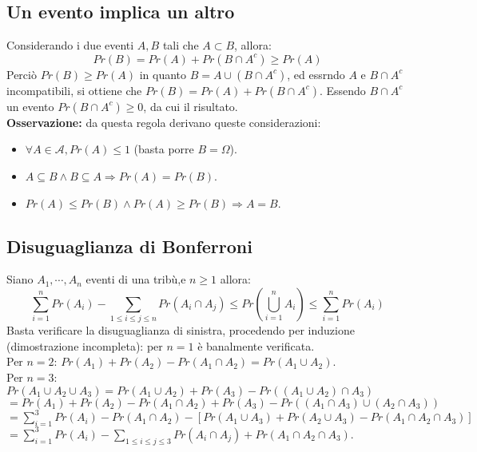 \subsection{Un evento implica un altro}
Considerando i due eventi $A,B$ tali che $A\subset B$, allora:
\begin{equation}
Pr(B)=Pr(A)+Pr(B\cap A^c)\ge Pr(A)
\end{equation}
Perci\`o $Pr(B)\ge Pr(A)$ in quanto $B=A\cup(B\cap A^c)$, ed essrndo $A$ e $B\cap A^c$ incompatibili, si ottiene che $Pr(B)=Pr(A)+Pr(B\cap A^c)$. Essendo
$B\cap A^c$ un evento $Pr(B\cap A^c)\ge 0$, da cui il risultato.\\
\textbf{Osservazione:} da questa regola derivano queste considerazioni:
\begin{itemize}
\item $\forall A\in\mathcal{A}, Pr(A)\le 1$ (basta porre $B=\Omega$).
\item $A\subseteq B\wedge B\subseteq A\Rightarrow Pr(A)=Pr(B)$.
\item $Pr(A)\le Pr(B)\wedge Pr(A)\ge Pr(B)\Rightarrow A=B$.
\end{itemize}
\subsection{Disuguaglianza di Bonferroni}
Siano $A_1,\cdots, A_n$ eventi di una trib\`u,e $n\ge 1$ allora:
\begin{equation}
\sum\limits_{i=1}^nPr(A_i)-\sum\limits_{1\le i\le j\le n}Pr(A_i\cap A_j)\le Pr(\bigcup\limits_{i=1}^nA_i)\le \sum\limits_{i=1}^nPr(A_i)
\end{equation}
Basta verificare la disuguaglianza di sinistra, procedendo per induzione (dimostrazione incompleta): per $n=1$ \`e banalmente verificata.\\
Per $n=2$: $Pr(A_1)+Pr(A_2)-Pr(A_1\cap A_2)=Pr(A_1\cup A_2)$.\\
Per $n=3$: $Pr(A_1\cup A_2\cup A_3)=Pr(A_1\cup A_2)+Pr(A_3)-Pr((A_1\cup A_2)\cap A_3)$\\
$=Pr(A_1)+Pr(A_2)-Pr(A_1\cap A_2)+Pr(A_3)-Pr((A_1\cap A_3)\cup (A_2\cap A_3))$\\
$=\sum\limits_{i=1}^3Pr(A_i)-Pr(A_1\cap A_2)-[Pr(A_1\cup A_3)+Pr(A_2\cup A_3)-Pr(A_1\cap A_2\cap A_3)]$\\
$=\sum\limits_{i=1}^3Pr(A_i)-\sum\limits_{1\le i\le j\le 3}Pr(A_i\cap A_j)+Pr(A_1\cap A_2\cap A_3)$.
